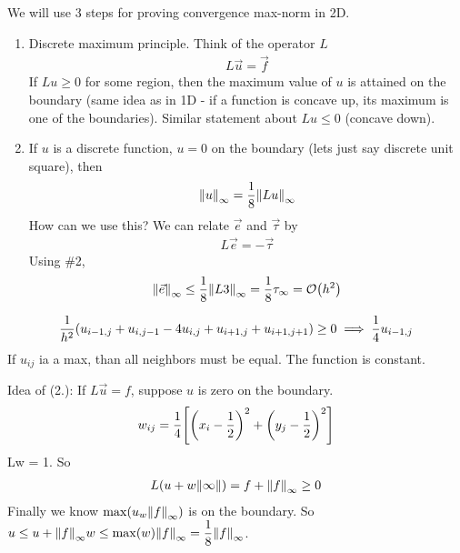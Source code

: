 \documentclass{article}
\begin{document}
        We will use 3 steps for proving convergence max-norm in 2D.
        \begin{enumerate}
            \item
                Discrete maximum principle.  Think of the operator $L$
                \begin{align}
                    L\vec{u} = \vec{f}
                \end{align}
                If $Lu \geq 0$ for some region, then the maximum value of $u$ is attained on the boundary (same idea as in 1D - if a function is concave up, its maximum is one of the boundaries).  Similar statement about $Lu \leq 0$ (concave down).
            \item
                If $u$ is a discrete function, $u = 0$ on the boundary (lets just say discrete unit square), then
                \begin{align}
                    \norm{u}_\infty = \frac{1}{8}\norm{Lu}_\infty
                \end{align}
                How can we use this?  We can relate $\vec{e}$ and $\vec{\tau}$ by
                \begin{align}
                    L\vec{e} = -\vec{\tau}
                \end{align}
                Using \#2,
                \begin{align}
                    \norm{\vec{e}}_\infty \leq \frac{1}{8}\norm{L3}_\infty = \frac{1}{8}\tau_\infty = \order{h^2}
                \end{align}
        \end{enumerate}

        \begin{align}
            \frac{1}{h^2} \qty(u_{i-1,j} + u_{i,j-1} - 4 u_{i,j} + u_{i+1,j} + u_{i+1,j+1}) \geq 0 \implies \frac{1}{4}u_{i-1,j}
        \end{align}
        If $u_{ij}$ ia a max, than all neighbors must be equal.  The function is constant.

        Idea of (2.):  If $L\vec{u} = f$, suppose $u$ is zero on the boundary.
        \begin{align}
            w_{ij} = \frac{1}{4}\qty[\qty(x_i - \frac{1}{2})^2 + \qty(y_j - \frac{1}{2})^2]
        \end{align}
        Lw = 1.  So
        \begin{align}
            L(u + w\norm{\infty}) = f + \norm{f}_\infty \geq 0
        \end{align}
        Finally we know $\max(u _ w \norm{f}_\infty)$ is on the boundary.  So $u \leq u + \norm{f}_\infty w \leq \max(w)\norm{f}_\infty = \dfrac{1}{8}\norm{f}_\infty$.
\end{document}
